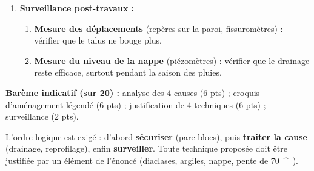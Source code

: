 \documentclass[11pt]{article}
\providecommand{\degree}{^{\circ}}
\begin{document}
\begin{corrige}
\begin{enumerate}
      \begin{enumerate}
      \item \textbf{Bénétage :} les banquettes réduisent la hauteur de chute libre et \textbf{interceptent les blocs} détachés des diaclases ; elles facilitent aussi le drainage et l'entretien.
      \item \textbf{Drains :} en abaissant la nappe, ils \textbf{assèchent les argiles} : fin du gonflement, retour de la cohésion et du frottement sur les plans de glissement. On agit sur la cause principale (l'eau).
      \item \textbf{Soutènement :} le mur ou le clouage apporte une \textbf{butée} au pied qui maintient les blocs de grès et compense le soutien perdu lors de l'éboulement.
      \item \textbf{Pare-blocs :} il \textbf{arrête les blocs} qui se détacheraient encore et protège directement les usagers de la RN1 (protection passive) pendant et après les travaux.
      \end{enumerate}
\item \textbf{Surveillance post-travaux :}
      \begin{enumerate}
      \item \textbf{Mesure des déplacements} (repères sur la paroi, fissuromètres) : vérifier que le talus ne bouge plus.
      \item \textbf{Mesure du niveau de la nappe} (piézomètres) : vérifier que le drainage reste efficace, surtout pendant la saison des pluies.
      \end{enumerate}
\end{enumerate}
\textbf{Barème indicatif (sur 20) :} analyse des 4 causes (6 pts) ; croquis d'aménagement légendé (6 pts) ; justification de 4 techniques (6 pts) ; surveillance (2 pts).
\end{corrige}
\begin{attention}
L'ordre logique est exigé : d'abord \textbf{sécuriser} (pare-blocs), puis \textbf{traiter la cause} (drainage, reprofilage), enfin \textbf{surveiller}. Toute technique proposée doit être justifiée par un élément de l'énoncé (diaclases, argiles, nappe, pente de \SI{70}{\degree}).
\end{attention}
\end{document}
